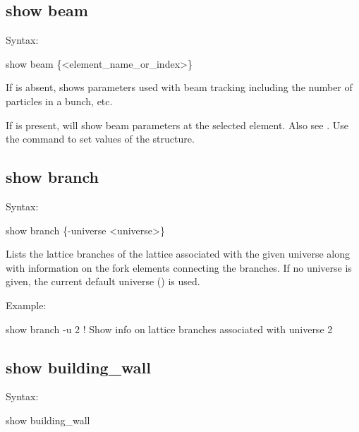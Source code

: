 {{{{{{{{%

\subsection{show beam}
\label{s:show.beam}

Syntax:
\begin{example}
  show beam \{<element_name_or_index>\}
\end{example}

If  is absent,  shows parameters used with beam tracking
including the number of particles in a bunch, etc.

If  is present,  will show beam parameters at the selected
element. Also see .  Use the  command to set values of the
 structure.


\subsection{show branch}
\label{s:show.branch}

Syntax:
\begin{example}
  show branch \{-universe <universe>\}
\end{example}


Lists the lattice branches of the lattice associated with the given universe along with
information on the fork elements connecting the branches.  If no universe is given, the
current default universe () is used.

Example:
\begin{example}
  show branch -u 2     ! Show info on lattice branches associated with universe 2
\end{example}


\subsection{show building_wall}
\label{s:show.building}

Syntax:
\begin{example}
  show building_wall
\end{example}
 

}}}}}}}}
